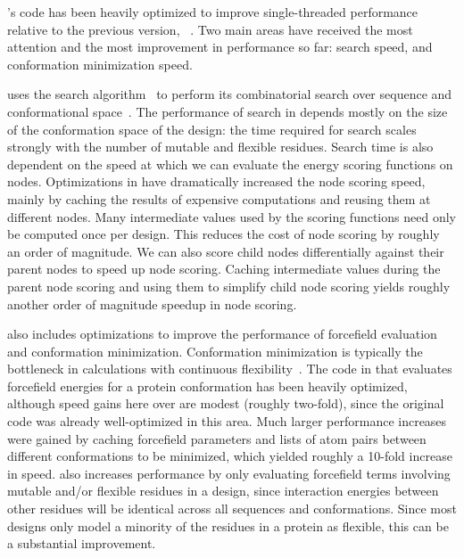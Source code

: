 's code has been heavily optimized to improve single-threaded performance relative to the previous version, ~\cite{COMETS}. Two main areas have received the most attention and the most improvement in performance so far: \as search speed, and conformation minimization speed.

\osprey uses the \as search algorithm~\cite{DEE/A*} to perform its combinatorial search over sequence and conformational space~\cite{minDEE,iMinDEE,DEEPer}.  The performance of \as search in \osprey depends mostly on the size of the conformation space of the design: the time required for search scales strongly with the number of mutable and flexible residues. Search time is also dependent on the speed at which we can evaluate the energy scoring functions on \as nodes. Optimizations in  have dramatically increased the \as node scoring speed, mainly by caching the results of expensive computations and reusing them at different nodes. Many intermediate values used by the \as scoring functions need only be computed once per design. This reduces the cost of node scoring by roughly an order of magnitude. We can also score child nodes differentially against their parent nodes to speed up node scoring. Caching intermediate values during the parent node scoring and using them to simplify child node scoring yields roughly another order of magnitude speedup in \as node scoring. %

 also includes optimizations to improve the performance of forcefield evaluation and conformation minimization. Conformation minimization is typically the bottleneck in \osprey calculations with continuous flexibility~\cite{minDEE,iMinDEE,DEEPer,CATS}.  The code in  that evaluates forcefield energies for a protein conformation has been heavily optimized, although speed gains here over  are modest (roughly two-fold), since the original code was already well-optimized in this area. Much larger performance increases were gained by caching forcefield parameters and lists of atom pairs between different conformations to be minimized, which yielded roughly a 10-fold increase in speed.  also increases performance by only evaluating forcefield terms involving mutable and/or flexible residues in a design, since interaction energies between other residues will be identical across all sequences and conformations.  Since most designs only model a minority of the residues in a protein as flexible, this can be a substantial improvement. 

